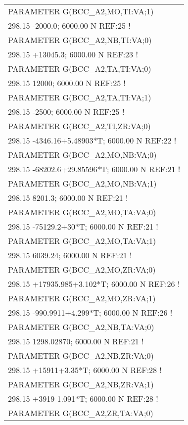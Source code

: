\begin{longtable}[H]{ l l l }
	PARAMETER G(BCC\_A2,MO,TI:VA;1) & & \\
	\multicolumn{3}{l}{298.15  -2000.0; 6000.00 N REF:25 !}\\
	PARAMETER G(BCC\_A2,NB,TI:VA;0) & & \\
	\multicolumn{3}{l}{298.15  +13045.3; 6000.00 N REF:23 !}\\	 
	PARAMETER G(BCC\_A2,TA,TI:VA;0) & & \\
	\multicolumn{3}{l}{298.15  12000; 6000.00 N REF:25 !}\\
	PARAMETER G(BCC\_A2,TA,TI:VA;1) & & \\
	\multicolumn{3}{l}{298.15  -2500; 6000.00 N REF:25 !}\\	 
	PARAMETER G(BCC\_A2,TI,ZR:VA;0) & & \\
	\multicolumn{3}{l}{298.15  -4346.16+5.48903*T; 6000.00 N REF:22  !}\\	 
	PARAMETER G(BCC\_A2,MO,NB:VA;0) & & \\
	\multicolumn{3}{l}{298.15 -68202.6+29.85596*T; 6000.00 N REF:21 !}\\
	PARAMETER G(BCC\_A2,MO,NB:VA;1) & & \\
	\multicolumn{3}{l}{298.15 8201.3; 6000.00 N REF:21 !}\\
	PARAMETER G(BCC\_A2,MO,TA:VA;0) & & \\
	\multicolumn{3}{l}{298.15 -75129.2+30*T; 6000.00 N REF:21 !}\\
	PARAMETER G(BCC\_A2,MO,TA:VA;1) & & \\
	\multicolumn{3}{l}{298.15 6039.24; 6000.00 N REF:21 !}\\
	PARAMETER G(BCC\_A2,MO,ZR:VA;0) & & \\
	\multicolumn{3}{l}{298.15 +17935.985+3.102*T; 6000.00 N REF:26 !}\\
	PARAMETER G(BCC\_A2,MO,ZR:VA;1)  & & \\
	\multicolumn{3}{l}{298.15  -990.9911+4.299*T; 6000.00 N REF:26 !}\\
	PARAMETER G(BCC\_A2,NB,TA:VA;0) & & \\
	\multicolumn{3}{l}{298.15 1298.02870; 6000.00 N REF:21 !}\\
	PARAMETER G(BCC\_A2,NB,ZR:VA;0) & & \\
	\multicolumn{3}{l}{298.15  +15911+3.35*T; 6000.00 N REF:28 !}\\
	PARAMETER G(BCC\_A2,NB,ZR:VA;1) & & \\
	\multicolumn{3}{l}{298.15 +3919-1.091*T; 6000.00 N REF:28 !}\\
	PARAMETER G(BCC\_A2,ZR,TA:VA;0) & & \\

\end{longtable}
